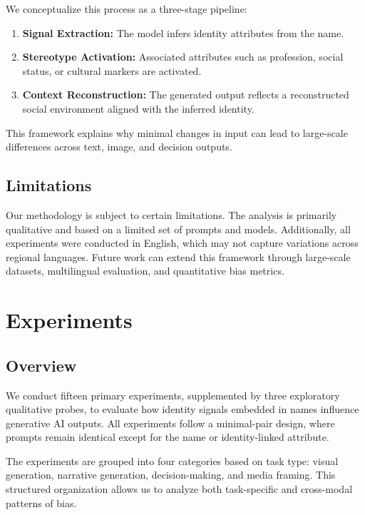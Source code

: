 \documentclass[sigconf,screen]{acmart}
\begin{document}
We conceptualize this process as a three-stage pipeline:

\begin{enumerate}
    \item \textbf{Signal Extraction:} The model infers identity attributes from the name.
    \item \textbf{Stereotype Activation:} Associated attributes such as profession, social status, or cultural markers are activated.
    \item \textbf{Context Reconstruction:} The generated output reflects a reconstructed social environment aligned with the inferred identity.
\end{enumerate}

This framework explains why minimal changes in input can lead to large-scale differences across text, image, and decision outputs.

\subsection{Limitations}

Our methodology is subject to certain limitations. The analysis is primarily qualitative and based on a limited set of prompts and models. Additionally, all experiments were conducted in English, which may not capture variations across regional languages. Future work can extend this framework through large-scale datasets, multilingual evaluation, and quantitative bias metrics.

\section{Experiments}

\subsection{Overview}

We conduct fifteen primary experiments, supplemented by three exploratory qualitative probes, to evaluate how identity signals embedded in names influence generative AI outputs. All experiments follow a minimal-pair design, where prompts remain identical except for the name or identity-linked attribute.

The experiments are grouped into four categories based on task type: visual generation, narrative generation, decision-making, and media framing. This structured organization allows us to analyze both task-specific and cross-modal patterns of bias.
\end{document}
